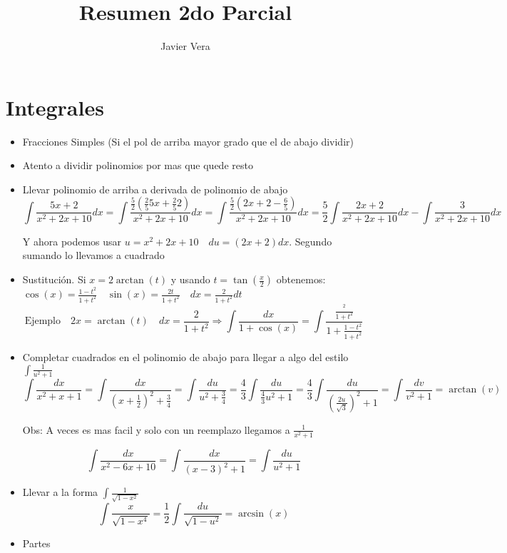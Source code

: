 \documentclass{article}
\theoremstyle{break}
\begin{document}
    
    \title{Resumen 2do Parcial}
    \author{Javier Vera}
    \maketitle

    \section{Integrales}
    \begin{itemize}
		 \item Fracciones Simples (Si el pol de arriba mayor grado que el de abajo dividir)
		\item Atento a dividir polinomios por mas que quede resto
		\item Llevar polinomio de arriba a derivada de polinomio de abajo
				\[\int \frac{5x+2}{x^2+2x+10}dx = \int \frac{\frac{5}{2}(\frac{2}{5}5x+\frac{2}{5}2)}{x^2+2x+10}dx = \int \frac{\frac{5}{2}(2x+2-\frac{6}{5})}{x^2+2x+10}dx = \frac{5}{2}\int \frac{2x+2}{x^2+2x+10}dx -\int \frac{3}{x^2+2x+10}dx\]

				Y ahora podemos usar $u=x^2+2x+10 \quad du=(2x+2)dx$. Segundo sumando lo llevamos a cuadrado


		\item Sustitución. Si $x = 2\arctan(t)$ y usando $ t=\tan( \frac{x}{2} )$ obtenemos: 	
				$\cos (x) = \frac{1-t^2}{1+t^2} \quad \sin (x) = \frac{2t}{1+t^2} \quad dx = \frac{2}{1+t^2}dt$
				\[\text{Ejemplo}\quad 2x=\arctan (t) \quad dx=\frac{2}{1+t^2} \Rightarrow \int \frac{dx}{1+\cos(x)} = \int \frac{\frac{^2}{1+t^2}}{1+\frac{1-t^2}{1+t^2}}\]

		\item Completar cuadrados en el polinomio de abajo para llegar a algo del estilo $\int \frac{1}{u^2+1}$
				\[\int \frac{dx}{x^2+x+1} = \int \frac{dx}{(x+ \frac{1}{2})^2 + \frac{3}{4}} = \int \frac{du}{u^2 + \frac{3}{4}} 
				= \frac{4}{3}\int {\frac{du}{\frac{4}{3}u^2 + 1}} = \frac{4}{3} \int{\frac{du}{(\frac{2u}{\sqrt{3}})^2+1}} 
				= \int{ \frac{dv}{v^2 + 1}} = \arctan(v)\]
	
				Obs: A veces es mas facil y solo con un reemplazo llegamos a $\frac{1}{x^2+1}$

				\[\int \frac{dx}{x^2-6x+10} = \int \frac{dx}{(x-3)^2+1} = \int \frac{du}{u^2+1}\]

		\item Llevar a la forma $\int \frac{1}{\sqrt{1-x^2}}$
				\[\int \frac{x}{\sqrt{1-x^4}} = \frac{1}{2}\int \frac{du}{\sqrt{1-u^2}} = \arcsin(x)\]
		\item Partes


\end{itemize}
\end{document}
